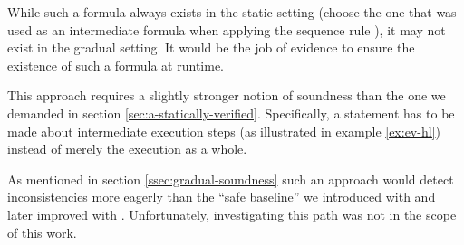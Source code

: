 \begin{description}
\begin{example}{}
        While such a formula always exists in the static setting (choose the one that was used as an intermediate formula when applying the sequence rule ), it may not exist in the gradual setting.
        It would be the job of evidence to ensure the existence of such a formula at runtime.
    \end{example}
    
    This approach requires a slightly stronger notion of soundness than the one we demanded in section \ref{sec:a-statically-verified}.
    Specifically, a statement has to be made about intermediate execution steps (as illustrated in example \ref{ex:ev-hl}) instead of merely the execution as a whole.
    
    As mentioned in section \ref{ssec:gradual-soundness} such an approach would detect inconsistencies more eagerly than the “safe baseline” we introduced with  and later improved with .
    Unfortunately, investigating this path was not in the scope of this work.
\end{description}

